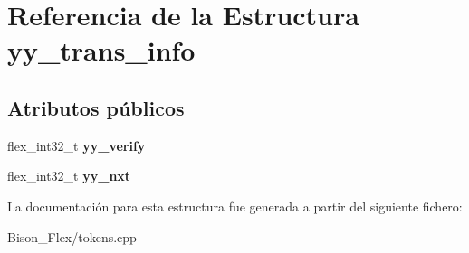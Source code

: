 \hypertarget{structyy__trans__info}{\section{Referencia de la Estructura yy\-\_\-trans\-\_\-info}
\label{structyy__trans__info}
}
\subsection*{Atributos públicos}
\begin{DoxyCompactItemize}
\item 
\hypertarget{structyy__trans__info_a5c9f61e770deef50bd4e697310342fe9}{flex\-\_\-int32\-\_\-t {\bfseries yy\-\_\-verify}}\label{structyy__trans__info_a5c9f61e770deef50bd4e697310342fe9}

\item 
\hypertarget{structyy__trans__info_ae0715250c2bef261e596e77e0030f13e}{flex\-\_\-int32\-\_\-t {\bfseries yy\-\_\-nxt}}\label{structyy__trans__info_ae0715250c2bef261e596e77e0030f13e}

\end{DoxyCompactItemize}


La documentación para esta estructura fue generada a partir del siguiente fichero\-:\begin{DoxyCompactItemize}
\item 
Bison\-\_\-\-Flex/tokens.\-cpp\end{DoxyCompactItemize}

